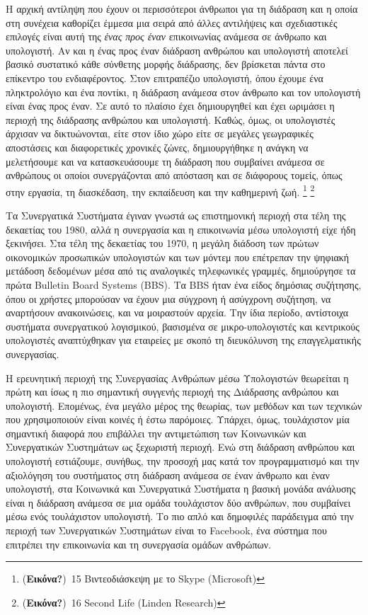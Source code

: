 \documentclass[
]{article}
\begin{document}
Η αρχική αντίληψη που έχουν οι περισσότεροι άνθρωποι για τη διάδραση και
η οποία στη συνέχεια καθορίζει έμμεσα μια σειρά από άλλες αντιλήψεις και
σχεδιαστικές επιλογές είναι αυτή της \emph{ένας προς έναν} επικοινωνίας
ανάμεσα σε άνθρωπο και υπολογιστή. Αν και η ένας προς έναν διάδραση
ανθρώπου και υπολογιστή αποτελεί βασικό συστατικό κάθε σύνθετης μορφής
διάδρασης, δεν βρίσκεται πάντα στο επίκεντρο του ενδιαφέροντος. Στον
επιτραπέζιο υπολογιστή, όπου έχουμε ένα πληκτρολόγιο και ένα ποντίκι, η
διάδραση ανάμεσα στον άνθρωπο και τον υπολογιστή είναι ένας προς έναν.
Σε αυτό το πλαίσιο έχει δημιουργηθεί και έχει ωριμάσει η περιοχή της
διάδρασης ανθρώπου και υπολογιστή. Καθώς, όμως, οι υπολογιστές άρχισαν
να δικτυώνονται, είτε στον ίδιο χώρο είτε σε μεγάλες γεωγραφικές
αποστάσεις και διαφορετικές χρονικές ζώνες, δημιουργήθηκε η ανάγκη να
μελετήσουμε και να κατασκευάσουμε τη διάδραση που συμβαίνει ανάμεσα σε
ανθρώπους οι οποίοι συνεργάζονται από απόσταση και σε διάφορους τομείς,
όπως στην εργασία, τη διασκέδαση, την εκπαίδευση και την καθημερινή ζωή.
\footnote{(\textbf{Εικόνα?})~15 Βιντεοδιάσκεψη με το Skype (Microsoft)}
\footnote{(\textbf{Εικόνα?})~16 Second Life (Linden Research)}

Τα Συνεργατικά Συστήματα έγιναν γνωστά ως επιστημονική περιοχή στα τέλη
της δεκαετίας του 1980, αλλά η συνεργασία και η επικοινωνία μέσω
υπολογιστή είχε ήδη ξεκινήσει. Στα τέλη της δεκαετίας του 1970, η μεγάλη
διάδοση των πρώτων οικονομικών προσωπικών υπολογιστών και των μόντεμ που
επέτρεπαν την ψηφιακή μετάδοση δεδομένων μέσα από τις αναλογικές
τηλεφωνικές γραμμές, δημιούργησε τα πρώτα Bulletin Board Systems (BBS).
Τα BBS ήταν ένα είδος δημόσιας συζήτησης, όπου οι χρήστες μπορούσαν να
έχουν μια σύγχρονη ή ασύγχρονη συζήτηση, να αναρτήσουν ανακοινώσεις, και
να μοιραστούν αρχεία. Την ίδια περίοδο, αντίστοιχα συστήματα
συνεργατικού λογισμικού, βασισμένα σε μικρο-υπολογιστές και κεντρικούς
υπολογιστές αναπτύχθηκαν για εταιρείες με σκοπό τη διευκόλυνση της
επαγγελματικής συνεργασίας.

Η ερευνητική περιοχή της Συνεργασίας Ανθρώπων μέσω Υπολογιστών θεωρείται
η πρώτη και ίσως η πιο σημαντική συγγενής περιοχή της Διάδρασης ανθρώπου
και υπολογιστή. Επομένως, ένα μεγάλο μέρος της θεωρίας, των μεθόδων και
των τεχνικών που χρησιμοποιούν είναι κοινές ή έστω παρόμοιες. Υπάρχει,
όμως, τουλάχιστον μία σημαντική διαφορά που επιβάλλει την αντιμετώπιση
των Κοινωνικών και Συνεργατικών Συστημάτων ως ξεχωριστή περιοχή. Ενώ στη
διάδραση ανθρώπου και υπολογιστή εστιάζουμε, συνήθως, την προσοχή μας
κατά τον προγραμματισμό και την αξιολόγηση του συστήματος στη διάδραση
ανάμεσα σε έναν άνθρωπο και έναν υπολογιστή, στα Κοινωνικά και
Συνεργατικά Συστήματα η βασική μονάδα ανάλυσης είναι η διάδραση ανάμεσα
σε μια ομάδα τουλάχιστον δύο ανθρώπων, που συμβαίνει μέσω ενός
τουλάχιστον υπολογιστή. Το πιο απλό και δημοφιλές παράδειγμα από την
περιοχή των Συνεργατικών Συστημάτων είναι το Facebook, ένα σύστημα που
επιτρέπει την επικοινωνία και τη συνεργασία ομάδων ανθρώπων.
\end{document}
